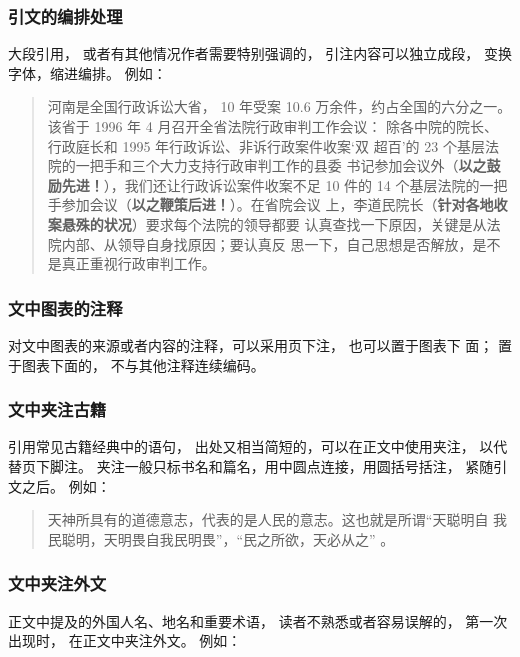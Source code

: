 \documentclass{article}
\begin{document}
\subsubsection{引文的编排处理}


大段引用， 或者有其他情况作者需要特别强调的， 引注内容可以独立成段，
变换字体，缩进编排。 例如：

\begin{quotation}
河南是全国行政诉讼大省， 10 年受案 10.6 万余件，约占全国的六分之一。
该省于 1996 年 4 月召开全省法院行政审判工作会议：
除各中院的院长、行政庭长和 1995 年行政诉讼、非诉行政案件收案‘双
超百’的 23 个基层法院的一把手和三个大力支持行政审判工作的县委
书记参加会议外（\textbf{以之鼓励先进！}），我们还让行政诉讼案件收案不足 10
件的 14 个基层法院的一把手参加会议（\textbf{以之鞭策后进！}）。在省院会议
上，李道民院长（\textbf{针对各地收案悬殊的状况}）要求每个法院的领导都要
认真查找一下原因，关键是从法院内部、从领导自身找原因；要认真反
思一下，自己思想是否解放，是不是真正重视行政审判工作。
\end{quotation}


\subsubsection{文中图表的注释}

对文中图表的来源或者内容的注释，可以采用页下注， 也可以置于图表下
面； 置于图表下面的， 不与其他注释连续编码。

\subsubsection{文中夹注古籍}


引用常见古籍经典中的语句， 出处又相当简短的，可以在正文中使用夹注，
以代替页下脚注。 夹注一般只标书名和篇名，用中圆点连接，用圆括号括注，
紧随引文之后。 例如：

\begin{quotation}
天神所具有的道德意志，代表的是人民的意志。这也就是所谓“天聪明自
我民聪明，天明畏自我民明畏”，“民之所欲，天必从之”
。
\end{quotation}


\subsubsection{文中夹注外文}

正文中提及的外国人名、地名和重要术语， 读者不熟悉或者容易误解的，
第一次出现时， 在正文中夹注外文。 例如：
\end{document}
